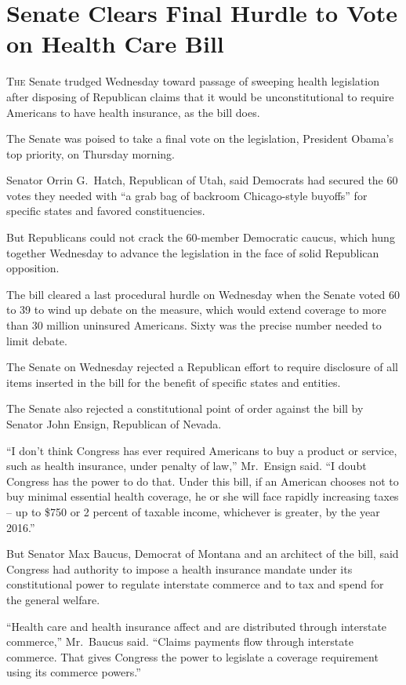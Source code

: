 ﻿\documentclass[12pt]{article}
\begin{document}
\section{Senate Clears Final Hurdle to Vote on Health Care Bill}

\lettrine{T}{he} Senate trudged Wednesday toward passage of sweeping health
legislation after disposing of Republican claims that it would be unconstitutional to require
Americans to have health insurance, as the bill does.

The Senate was poised to take a final vote on the legislation, President Obama's top priority, on
Thursday morning.

Senator Orrin G.~Hatch, Republican of Utah, said Democrats had secured the 60 votes they needed with
``a grab bag of backroom Chicago-style buyoffs'' for specific states and favored constituencies.

But Republicans could not crack the 60-member Democratic caucus, which hung together Wednesday to
advance the legislation in the face of solid Republican opposition.

The bill cleared a last procedural hurdle on Wednesday when the Senate voted 60 to 39 to wind up
debate on the measure, which would extend coverage to more than 30 million uninsured Americans.
Sixty was the precise number needed to limit debate.

The Senate on Wednesday rejected a Republican effort to require disclosure of all items inserted in
the bill for the benefit of specific states and entities.

The Senate also rejected a constitutional point of order against the bill by Senator John Ensign,
Republican of Nevada.

``I don't think Congress has ever required Americans to buy a product or service, such as health
insurance, under penalty of law,'' Mr.~Ensign said. ``I doubt Congress has the power to do that.
Under this bill, if an American chooses not to buy minimal essential health coverage, he or she will
face rapidly increasing taxes -- up to \$750 or 2 percent of taxable income, whichever is greater,
by the year 2016.''

But Senator Max Baucus, Democrat of Montana and an architect of the bill, said Congress had
authority to impose a health insurance mandate under its constitutional power to regulate interstate
commerce and to tax and spend for the general welfare.

``Health care and health insurance affect and are distributed through interstate commerce,''
Mr.~Baucus said. ``Claims payments flow through interstate commerce. That gives Congress the power
to legislate a coverage requirement using its commerce powers.''
\end{document}
